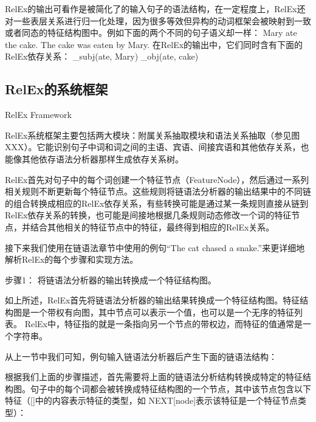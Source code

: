 RelEx的输出可看作是被简化了的输入句子的语法结构，在一定程度上，RelEx还对一些表层关系进行归一化处理，因为很多等效但异构的动词框架会被映射到一致或者同态的特征结构图中。例如下面的两个不同的句子语义却一样：
             Mary ate the cake.
           The cake was eaten by Mary.
在RelEx的输出中，它们同时含有下面的RelEx依存关系：
       \_subj(ate, Mary)
            \_obj(ate, cake)

\subsection{RelEx的系统框架}{RelEx Framework}

RelEx系统框架主要包括两大模块：附属关系抽取模块和语法关系抽取（参见图XXX）。它能识别句子中词和词之间的主语、宾语、间接宾语和其他依存关系，也能像其他依存语法分析器那样生成依存关系树。 

RelEx首先对句子中的每个词创建一个特征节点（FeatureNode），然后通过一系列相关规则不断更新每个特征节点。这些规则将链语法分析器的输出结果中的不同链的组合转换成相应的RelEx依存关系，有些转换可能是通过某一条规则直接从链到RelEx依存关系的转换，也可能是间接地根据几条规则动态修改一个词的特征节点，并结合其他相关的特征节点中的特征，最终得到相应的RelEx关系。

接下来我们使用在链语法章节中使用的例句“The cat chased a snake.”来更详细地解析RelEx的每个步骤和实现方法。

\rm{步骤1： 将链语法分析器的输出转换成一个特征结构图。}

如上所述，RelEx首先将链语法分析器的输出结果转换成一个特征结构图。特征结构图是一个带权有向图，其中节点可以表示一个值，也可以是一个无序的特征列表。 RelEx中，特征指的就是一条指向另一个节点的带权边，而特征的值通常是一个字符串。

从上一节中我们可知，例句输入链语法分析器后产生下面的链语法结构： 

根据我们上面的步骤描述，首先需要将上面的链语法分析结构转换成特定的特征结构图。句子中的每个词都会被转换成特征结构图的一个节点，其中该节点包含以下特征（[]中的内容表示特征的类型，如 NEXT[node]表示该特征是一个特征节点类型）：

